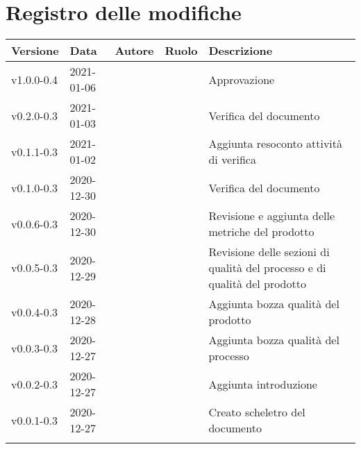 \section*{\hfil Registro delle modifiche \hfil}
{
	\newlength{\freewidth}
	\setlength{\freewidth}{\dimexpr\textwidth-10\tabcolsep}
	\renewcommand{\arraystretch}{1.5}
	\centering
	\setlength{\aboverulesep}{0pt}
	\setlength{\belowrulesep}{0pt}
	\begin{longtable}{C{.131777\freewidth} C{.134036\freewidth} C{.263554\freewidth} C{.188254\freewidth} C{.282379\freewidth}}
		\toprule 
		\textbf{Versione} & \textbf{Data} & \textbf{Autore} & \textbf{Ruolo} & \textbf{Descrizione}\\
		\toprule
		\endhead
		
		v1.0.0-0.4 & 2021-01-06 & \Daniele & \ver & Approvazione \\
		v0.2.0-0.3 & 2021-01-03 & \Davide \newline \Giosue & \vers & Verifica del documento \\	
		v0.1.1-0.3 & 2021-01-02 & \Lucrezia & \ana & Aggiunta resoconto attività di verifica \\	
		v0.1.0-0.3 & 2020-12-30 & \Daniele & \ver & Verifica del documento \\
		v0.0.6-0.3 & 2020-12-30 & \Francesco & \ana & Revisione e aggiunta delle metriche del prodotto \\
		v0.0.5-0.3 & 2020-12-29 & \Francesco & \ana & Revisione delle sezioni di qualità del processo e di qualità del prodotto \\
		v0.0.4-0.3 & 2020-12-28 & \Francesco & \ana & Aggiunta bozza qualità del prodotto \\
		v0.0.3-0.3 & 2020-12-27 & \Francesco & \ana & Aggiunta bozza qualità del processo \\
		v0.0.2-0.3 & 2020-12-27 & \Lucrezia & \ana & Aggiunta introduzione \\
		v0.0.1-0.3 & 2020-12-27 & \Francesco & \ana & Creato scheletro del documento \\
			
		\bottomrule
		\hiderowcolors
	\end{longtable}
}

